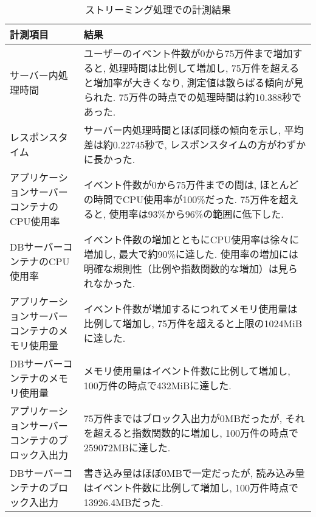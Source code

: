 \documentclass[../../../main]{subfiles}
\begin{document}
    \begin{table}[H]
        \centering
        \caption{ストリーミング処理での計測結果}
        \label{tab:result-streaming}
        \begin{tabular}{|p{4cm}|p{10cm}|}
            \hline
            \textbf{計測項目}                & \textbf{結果}                                                                                                              \\ \hline
            サーバー内処理時間                    & ユーザーのイベント件数が0から75万件まで増加すると, 処理時間は比例して増加し, 75万件を超えると増加率が大きくなり, 測定値は散らばる傾向が見られた. 75万件の時点での処理時間は約10.388秒であった.                     \\ \hline
            レスポンスタイム                     & サーバー内処理時間とほぼ同様の傾向を示し, 平均差は約0.22745秒で, レスポンスタイムの方がわずかに長かった.                                                                  \\ \hline
            アプリケーションサーバーコンテナのCPU使用率      & イベント件数が0から75万件までの間は, ほとんどの時間でCPU使用率が100\%だった. 75万件を超えると, 使用率は93\%から96\%の範囲に低下した.                                              \\ \hline
            DBサーバーコンテナのCPU使用率            & イベント件数の増加とともにCPU使用率は徐々に増加し, 最大で約90\%に達した. 使用率の増加には明確な規則性（比例や指数関数的な増加）は見られなかった.                                               \\ \hline
            アプリケーションサーバーコンテナのメモリ使用量      & イベント件数が増加するにつれてメモリ使用量は比例して増加し, 75万件を超えると上限の1024MiBに達した.                                                                     \\ \hline
            DBサーバーコンテナのメモリ使用量            & メモリ使用量はイベント件数に比例して増加し, 100万件の時点で432MiBに達した.                                                                                 \\ \hline
            アプリケーションサーバーコンテナのブロック入出力     & 75万件まではブロック入出力が0MBだったが, それを超えると指数関数的に増加し, 100万件の時点で259072MBに達した.                                                            \\ \hline
            DBサーバーコンテナのブロック入出力           & 書き込み量はほぼ0MBで一定だったが, 読み込み量はイベント件数に比例して増加し, 100万件時点で13926.4MBだった.                                                              \\ \hline

\end{tabular}
\end{table}
\end{document}
